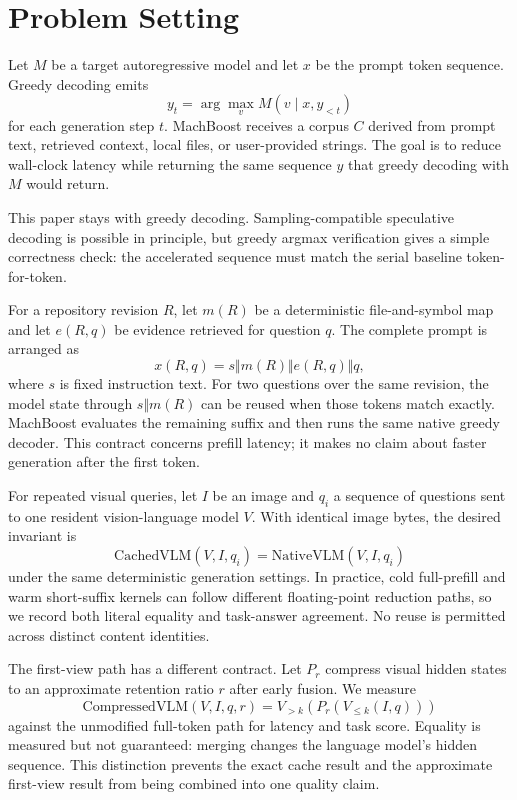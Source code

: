 \documentclass[11pt]{article}
\begin{document}
\section{Problem Setting}
Let $M$ be a target autoregressive model and let $x$ be the prompt token sequence. Greedy decoding emits
\[
  y_t = \arg\max_v M(v \mid x, y_{<t})
\]
for each generation step $t$. MachBoost receives a corpus $C$ derived from prompt text, retrieved context, local files, or user-provided strings. The goal is to reduce wall-clock latency while returning the same sequence $y$ that greedy decoding with $M$ would return.

This paper stays with greedy decoding. Sampling-compatible speculative decoding is possible in principle, but greedy argmax verification gives a simple correctness check: the accelerated sequence must match the serial baseline token-for-token.

For a repository revision $R$, let $m(R)$ be a deterministic file-and-symbol
map and let $e(R,q)$ be evidence retrieved for question $q$. The complete
prompt is arranged as
\[
  x(R,q)=s \Vert m(R) \Vert e(R,q) \Vert q,
\]
where $s$ is fixed instruction text. For two questions over the same revision,
the model state through $s \Vert m(R)$ can be reused when those tokens match
exactly. MachBoost evaluates the remaining suffix and then runs the same native
greedy decoder. This contract concerns prefill latency; it makes no claim about
faster generation after the first token.

For repeated visual queries, let $I$ be an image and $q_i$ a sequence of questions sent to one resident vision-language model $V$. With identical image bytes, the desired invariant is
\[
  \mathrm{CachedVLM}(V,I,q_i)=\mathrm{NativeVLM}(V,I,q_i)
\]
under the same deterministic generation settings. In practice, cold full-prefill and warm short-suffix kernels can follow different floating-point reduction paths, so we record both literal equality and task-answer agreement. No reuse is permitted across distinct content identities.

The first-view path has a different contract. Let $P_r$ compress visual hidden states to an approximate retention ratio $r$ after early fusion. We measure
\[
  \mathrm{CompressedVLM}(V,I,q,r)=V_{>k}(P_r(V_{\leq k}(I,q)))
\]
against the unmodified full-token path for latency and task score. Equality is measured but not guaranteed: merging changes the language model's hidden sequence. This distinction prevents the exact cache result and the approximate first-view result from being combined into one quality claim.
\end{document}
